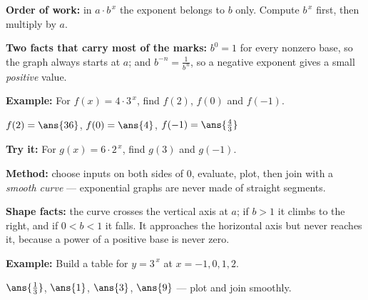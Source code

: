 \documentclass[12pt]{article}
\begin{document}


\begin{formulabox}
\textbf{Order of work:} in $a \cdot b^{\,x}$ the exponent belongs to $b$ only. Compute $b^{\,x}$ first, then multiply by $a$.\par
\textbf{Two facts that carry most of the marks:} $b^{0} = 1$ for every nonzero base, so the graph always starts at $a$; and $b^{-n} = \frac{1}{b^{\,n}}$, so a negative exponent gives a small \emph{positive} value.
\end{formulabox}

\begin{examplebox}
\textbf{Example:} \quad For $f(x) = 4 \cdot 3^{\,x}$, find $f(2)$, $f(0)$ and $f(-1)$.

$f(2) = \ans{36}$, \quad $f(0) = \ans{4}$, \quad $f(-1) = \ans{\tfrac{4}{3}}$
\end{examplebox}

\begin{tryitbox}
\textbf{Try it:} \quad For $g(x) = 6 \cdot 2^{\,x}$, find $g(3)$ and $g(-1)$.\\[2pt]
\end{tryitbox}


\begin{formulabox}
\textbf{Method:} choose inputs on both sides of $0$, evaluate, plot, then join with a \emph{smooth curve} --- exponential graphs are never made of straight segments.\par
\textbf{Shape facts:} the curve crosses the vertical axis at $a$; if $b > 1$ it climbs to the right, and if $0 < b < 1$ it falls. It approaches the horizontal axis but never reaches it, because a power of a positive base is never zero.
\end{formulabox}

\begin{examplebox}
\textbf{Example:} \quad Build a table for $y = 3^{\,x}$ at $x = -1, 0, 1, 2$.

$\ans{\tfrac{1}{3}}$, \quad $\ans{1}$, \quad $\ans{3}$, \quad $\ans{9}$ --- plot and join smoothly.
\end{examplebox}
\end{document}
